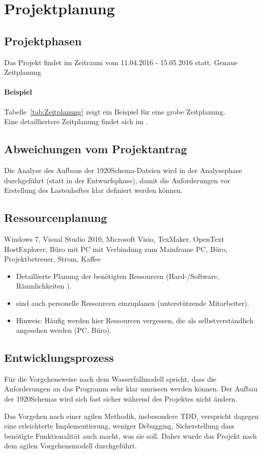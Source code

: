 \section{Projektplanung} 
\label{sec:Projektplanung}


\subsection{Projektphasen}
\label{sec:Projektphasen}
Das Projekt findet im Zeitraum vom 11.04.2016 - 15.05.2016 statt.
Genaue Zeitplanung

\paragraph{Beispiel}
Tabelle~\ref{tab:Zeitplanung} zeigt ein Beispiel für eine grobe Zeitplanung.
\\
Eine detailliertere Zeitplanung findet sich im .


\subsection{Abweichungen vom Projektantrag}
\label{sec:AbweichungenProjektantrag}
Die Analyse des Aufbaus der 1920Schema-Dateien wird in der Analysephase durchgeführt (statt in der Entwurfsphase), damit die Anforderungen vor Erstellung des Lastenheftes klar definiert werden können.


\subsection{Ressourcenplanung}
\label{sec:Ressourcenplanung}
Windows 7, Visual Studio 2010, Microsoft Visio, TexMaker, OpenText HostExplorer,  Büro mit PC mit Verbindung zum Mainframe
PC, Büro, Projektbetreuer, Strom, Kaffee
\begin{itemize}

	\item Detaillierte Planung der benötigten Ressourcen (Hard-/Software, Räumlichkeiten \usw).
	\item \Ggfs sind auch personelle Ressourcen einzuplanen (\zB unterstützende Mitarbeiter).
	\item Hinweis: Häufig werden hier Ressourcen vergessen, die als selbstverständlich angesehen werden (\zB PC, Büro). 
\end{itemize}


\subsection{Entwicklungsprozess}
\label{sec:Entwicklungsprozess}
Für die Vorgehensweise nach dem Wasserfallmodell spricht, dass die Anforderungen an das Programm sehr klar umrissen werden können. Der Aufbau der 1920Schemas wird sich fast sicher während des Projektes nicht ändern.

Das Vorgehen nach einer agilen Methodik, insbesondere \ac{TDD}, verspricht dagegen eine erleichterte Implementierung, weniger Debugging, Sicherstellung dass benötigte Funktionalität auch macht, was sie soll. Daher wurde das Projekt nach dem agilen Vorgehensmodell durchgeführt.






